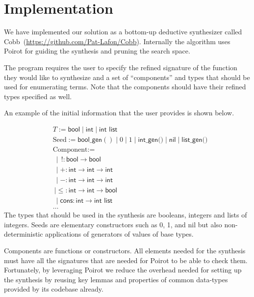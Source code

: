 \documentclass[review, sigplan]{acmart}
\begin{document}
\section{Implementation}
We have implemented our solution as a bottom-up deductive synthesizer called
Cobb~(\url{https://github.com/Pat-Lafon/Cobb}).
Internally the algorithm uses Poirot for guiding the synthesis and pruning
the search space.

The program requires the user to specify the refined signature of the function
they would like to synthesize and a set of ``components'' and types
that should be used for enumerating terms.
Note that the components should have their refined types specified as
well.

An example of the initial information that the user provides
is shown below.

\begin{align*}
& T := \textsf{bool} \mid \textsf{int} \mid \textsf{int list} \\
& \text{Seed} := \textsf{bool\_gen}() \mid 0 \mid 1 \mid \textsf{int\_gen()} \mid \textsf{nil} \mid \textsf{list\_gen()} \\
& \text{Component} := \\
&\  \mid\, !: \textsf{bool} \rightarrow \textsf{bool} \\
&\  \mid +: \textsf{int} \rightarrow \textsf{int} \rightarrow \textsf{int}\\
&\  \mid -: \textsf{int} \rightarrow \textsf{int} \rightarrow \textsf{int}\\
&\  \mid \leq: \textsf{int} \rightarrow \textsf{int} \rightarrow \textsf{bool} \\
&\  \mid \textsf{cons}: \textsf{int} \rightarrow \textsf{int list} \\
& \dots
\end{align*}
The types that should be used in the synthesis are
booleans, integers and lists of integers.
Seeds are elementary constructors such as 0, 1, and \textsf{nil}
but also non-deterministic applications of generators of values of
base types.

Components are functions or constructors.
All elements needed for the synthesis must have all the signatures
that are needed for Poirot to be able to check them.
Fortunately, by leveraging Poirot we reduce the overhead needed for setting
up the synthesis by reusing key lemmas and properties of common
data-types provided by its codebase already.
\end{document}
